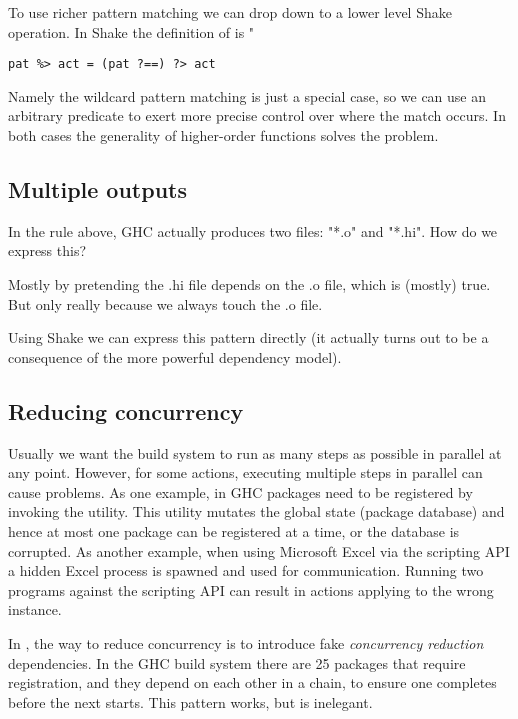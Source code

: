 To use richer pattern matching we can drop down to a lower level Shake operation. In Shake the definition of is \lst"%

\begin{verbatim}
pat %> act = (pat ?==) ?> act
\end{verbatim}

Namely the wildcard pattern matching is just a special case, so we can use an arbitrary predicate to exert more precise control over where the match occurs. In both cases the generality of higher-order functions solves the problem.

\subsection{Multiple outputs}


In the rule above, GHC actually produces two files: \lst"*.o" and \lst"*.hi". How do we express this?

Mostly by pretending the .hi file depends on the .o file, which is (mostly) true. But only really because we always touch the .o file.

Using Shake we can express this pattern directly (it actually turns out to be a consequence of the more powerful dependency model).

\subsection{Reducing concurrency}

Usually we want the build system to run as many steps as possible in parallel at
any point. However, for some actions, executing multiple steps in parallel can
cause problems. As one example, in GHC packages need to be registered by
invoking the  utility. This utility mutates the global state
(package database) and hence at most one package can be registered at a time, or
the database is corrupted. As another example, when using Microsoft Excel via
the scripting API a hidden Excel process is spawned and used for communication.
Running two programs against the scripting API can result in actions applying to
the wrong instance.

In \make{}, the way to reduce concurrency is to introduce fake \emph{concurrency
reduction} dependencies. In the GHC build system there are 25 packages that
require registration, and they depend on each other in a chain, to ensure one
completes before the next starts. This pattern works, but is inelegant.

